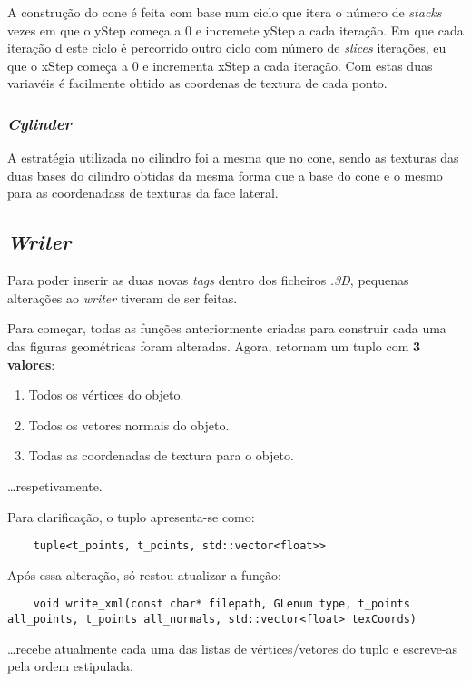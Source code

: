 \documentclass[relatorio.tex]{subfiles}
\begin{document}
A construção do cone é feita com base num ciclo que itera o número de \textit{stacks}
vezes em que o yStep começa a 0 e incremete yStep a cada iteração. Em que cada iteração d
este ciclo é percorrido outro ciclo com número de \textit{slices} iterações, eu que o xStep começa
a 0 e incrementa xStep a cada iteração. Com estas duas variavéis é facilmente obtido as coordenas de textura
de cada ponto.


\subsubsection{\textit{Cylinder}}
A estratégia utilizada no cilindro foi a mesma que no cone, sendo
as texturas das duas bases do cilindro obtidas da mesma forma que
a base do cone e o mesmo para as coordenadass de texturas da face lateral.



\subsection{\textit{Writer}} \label{subsec:writer}

Para poder inserir as duas novas \textit{tags}
dentro dos ficheiros \textit{.3D}, pequenas 
alterações ao \textit{writer} tiveram de ser feitas.

Para começar, todas as funções anteriormente 
criadas para construir cada uma das figuras 
geométricas foram alteradas.
Agora, retornam um tuplo com \textbf{3 valores}:
\begin{enumerate}
    \item Todos os vértices do objeto.
    \item Todos os vetores normais do objeto.
    \item Todas as coordenadas de textura para o objeto.
\end{enumerate}
\dots respetivamente.

Para clarificação, o tuplo apresenta-se como:
\begin{verbatim}
    tuple<t_points, t_points, std::vector<float>> 
\end{verbatim}

Após essa alteração, só restou atualizar a função:
\begin{verbatim}
    void write_xml(const char* filepath, GLenum type, t_points all_points, t_points all_normals, std::vector<float> texCoords)
\end{verbatim}
\dots recebe atualmente cada uma das listas de vértices/vetores 
do tuplo e escreve-as pela ordem estipulada.
\end{document}
